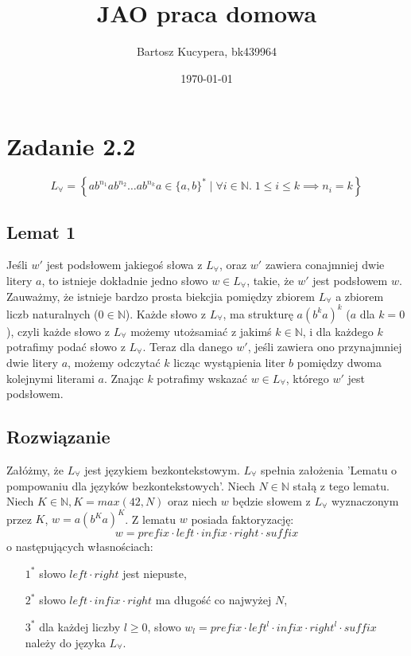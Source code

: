 \documentclass{article}
\title{JAO praca domowa}
\author{Bartosz Kucypera, bk439964}
\date{\today}
\begin{document}
\maketitle

\section*{Zadanie 2.2} 

$$ L_{\forall} = \displaystyle \left\{ab^{n_1}ab^{n_2} \dots ab^{n_{k}}a \in \{a, b\}^* \; | \; \forall i \in \mathbb{N}.\; 1 \le i \le k \implies n_i = k\right\}$$

\subsection*{Lemat 1}
Jeśli $w'$ jest podsłowem jakiegoś słowa z $L_{\forall}$, oraz $w'$ zawiera conajmniej dwie litery $a$, to istnieje dokładnie jedno słowo $w \in L_{\forall}$, takie, że $w'$ jest podsłowem $w$. \newline \newline
Zauważmy, że istnieje bardzo prosta biekcjia pomiędzy zbiorem $L_{\forall}$ a zbiorem liczb naturalnych ($0 \in \mathbb{N}$).
Każde słowo z $L_{\forall}$, ma strukturę $a(b^ka)^k$ ($a$ dla $k=0$), czyli każde słowo z $L_{\forall}$ możemy utożsamiać z jakimś $k \in \mathbb{N}$, i dla każdego $k$ potrafimy podać słowo z $L_{\forall}$. Teraz dla danego $w'$, jeśli zawiera ono przynajmniej dwie litery $a$, możemy odczytać $k$ licząc wystąpienia liter $b$ pomiędzy dwoma kolejnymi literami $a$. Znając $k$ potrafimy wskazać $w \in L_{\forall}$, którego $w'$ jest podsłowem.

\subsection*{Rozwiązanie}
Załóżmy, że $L_{\forall}$ jest językiem bezkontekstowym. \newline 
$L_{\forall}$ spełnia założenia 'Lematu o pompowaniu dla języków bezkontekstowych'. \newline 
Niech $N \in \mathbb{N}$ stałą z tego lematu. \newline
Niech $K \in \mathbb{N}, K=max(42, N)$ oraz niech $w$ będzie słowem z $L_{\forall}$ wyznaczonym przez $K$, $w=a(b^Ka)^K$.\newline 
Z lematu $w$ posiada faktoryzację: 
$$w = prefix  \cdot left \cdot infix \cdot right \cdot suffix$$
o następujących własnościach:

\begin{itemize}
	\item[$1^*$] słowo $left \cdot right$ jest niepuste,
	\item[$2^*$] słowo $left \cdot infix \cdot right$ ma długość co najwyżej $N$,
	\item[$3^*$] dla każdej liczby $l \ge 0$, słowo $w_l = prefix \cdot left^l \cdot infix \cdot right^l \cdot suffix$ należy do języka $L_{\forall}$.
\end{itemize}
\end{document}
